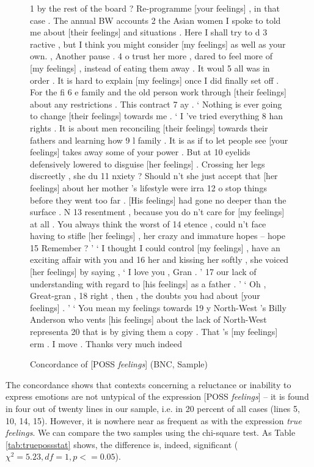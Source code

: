 \begin{figure}[!htbp]
\caption{Concordance of [POSS \textit{feelings}] (BNC, Sample)}
\label{fig:possfeelings}
\begin{fitverb}
 1  by the rest of the board ? Re-programme [your feelings] , in that case . The annual BW accounts
 2 the Asian women I spoke to told me about [their feelings] and situations . Here I shall try to d
 3 ractive , but I think you might consider [my feelings] as well as your own. , Another pause . 
 4 o trust her more , dared to feel more of [my feelings] , instead of eating them away . It woul
 5 all was in order . It is hard to explain [my feelings] once I did finally set off . For the fi
 6 e family and the old person work through [their feelings] about any restrictions . This contract 
 7   ay . ` Nothing is ever going to change [their feelings] towards me . ` I 've tried everything
 8 han rights . It is about men reconciling [their feelings] towards their fathers and learning how 
 9 l family . It is as if to let people see [your feelings] takes away some of your power . But at 
10  eyelids defensively lowered to disguise [her feelings] . Crossing her legs discreetly , she du
11 nxiety ? Should n't she just accept that [her feelings] about her mother 's lifestyle were irra
12 o stop things before they went too far . [His feelings] had gone no deeper than the surface . N
13 resentment , because you do n't care for [my feelings] at all . You always think the worst of 
14 etence , could n't face having to stifle [her feelings] , her crazy and immature hopes -- hope
15 Remember ? ' ` I thought I could control [my feelings] , have an exciting affair with you and 
16  her and kissing her softly , she voiced [her feelings] by saying , ` I love you , Gran . '
17 our lack of understanding with regard to [his feelings] as a father . ' ` Oh , Great-gran ,
18  right , then , the doubts you had about [your feelings] . ' ` You mean my feelings towards 
19 y North-West 's Billy Anderson who vents [his feelings] about the lack of North-West representa
20  that is by giving them a copy . That 's [my feelings] erm . I move . Thanks very much indeed 
\end{fitverb}
\end{figure}

The concordance shows that contexts concerning a reluctance or inability to express emotions are not untypical of the expression [POSS \textit{feelings}] --  it is found in four out of twenty lines in our sample, i.e. in 20 percent of all cases (lines 5, 10, 14, 15). However, it is nowhere near as frequent as with the expression \textit{true feelings}. We can compare the two samples using the chi-square test. As Table \ref{tab:truepossstat} shows, the difference is, indeed, significant ($\chi^2 = 5.23, df = 1, p < = 0.05$).

